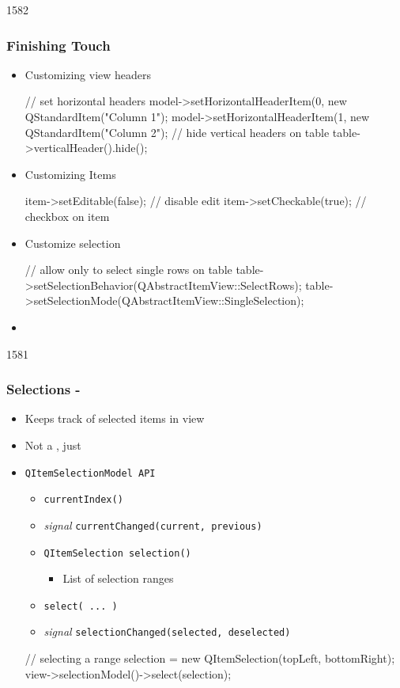 \begin{slide}[fragile]{1582}\frametitle{Finishing Touch}
  \begin{itemize}
  \item Customizing view headers
\begin{cpp}
// set horizontal headers
model->setHorizontalHeaderItem(0, new QStandardItem("Column 1");
model->setHorizontalHeaderItem(1, new QStandardItem("Column 2");
// hide vertical headers on table
table->verticalHeader().hide();
\end{cpp}
\item Customizing Items
\begin{cpp}
item->setEditable(false); // disable edit
item->setCheckable(true); // checkbox on item
\end{cpp}
\item Customize selection
\begin{cpp}
// allow only to select single rows on table
table->setSelectionBehavior(QAbstractItemView::SelectRows);
table->setSelectionMode(QAbstractItemView::SingleSelection);
\end{cpp}
\item[] 
\end{itemize}
\end{slide}


\begin{slide}[fragile]{1581}\frametitle{Selections - }
  \begin{itemize}
   \item Keeps track of selected items in view
    \item Not a , just 
 \item \texttt{QItemSelectionModel API}
    \begin{itemize}
    \item \texttt{currentIndex()}
    \item \textit{signal} \texttt{currentChanged(current, previous)}
    \item \texttt{QItemSelection selection()}
      \begin{itemize}
      \item List of selection ranges
      \end{itemize}
    \item \texttt{select( ... )}
    \item \textit{signal} \texttt{selectionChanged(selected, deselected)}
  \end{itemize}
  \begin{cpp}
// selecting a range
selection = new QItemSelection(topLeft, bottomRight);
view->selectionModel()->select(selection);    
  \end{cpp}
  \end{itemize}
\end{slide}

